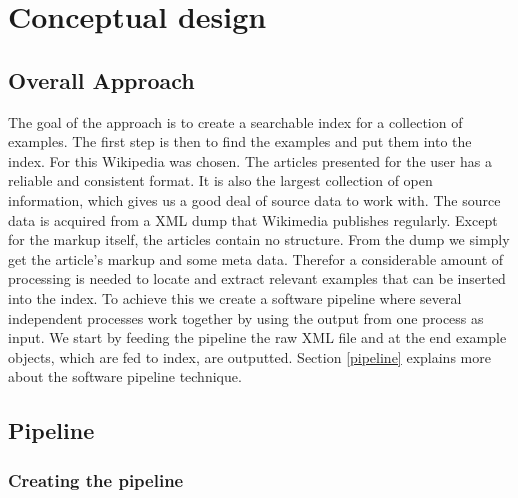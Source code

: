 
\chapter{Conceptual design}\label{cap_3}



\section{Overall Approach}

The goal of the approach is to create a searchable index for a collection of examples. The first step is then to find the examples and put them into the index. For this Wikipedia was chosen. The articles presented for the user has a reliable and consistent format. It is also the largest collection of open information, which gives us a good deal of source data to work with. The source data is acquired from a XML dump that Wikimedia publishes regularly. Except for the markup itself, the articles contain no structure. From the dump we simply get the article's markup and some meta data. Therefor a considerable amount of processing is needed to locate and extract relevant examples that can be inserted into the index. To achieve this we create a software pipeline where several independent processes work together by using the output from one process as input. We start by feeding the pipeline the raw XML file and at the end example objects, which are fed to index, are outputted. Section \ref{pipeline} explains more about the software pipeline technique. 


\section{Pipeline} \label{cd_pipeline}

\subsection{Creating the pipeline} \label{custom-pipeline}

